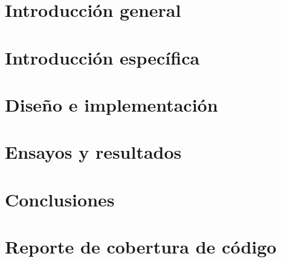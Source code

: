 \documentclass[
    11pt,
    spanish,
    singlespacing,
    parskip,
    headsepline,
    bookmarks=true,
    unicode=true,
    pdftoolbar=true,
    pdfmenubar=true,
    pdffitwindow=false,
    colorlinks=true,
    linkcolor=blue,
    citecolor=blue,
    urlcolor=blue
]{MastersDoctoralThesis}
\begin{document}
% 

\chapter{Introducción general}

\chapter{Introducción específica}

\chapter{Diseño e implementación}

\chapter{Ensayos y resultados}
\label{chap:resultados}

\chapter{Conclusiones}


\appendix

\chapter{Reporte de cobertura de código}

% 


\renewcommand{\bibname}{Bibliografía} %

\printbibliography[heading=bibintoc]
\end{document}
